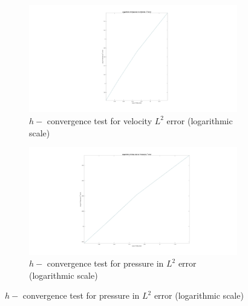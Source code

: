 \documentclass[a4paper]{book}
\begin{document}
\begin{figure}
\begin{subfigure}{\textwidth}	
  \includegraphics[width=\linewidth]{l2_velocity_log_stokes.jpg}
  \caption{$h-$ convergence test for velocity $L^2$ error (logarithmic scale)}
  \label{fig:vel_stoke_conv_log}
\end{subfigure}
\begin{subfigure}{\textwidth}	
  \includegraphics[width=\linewidth]{l2_pressure_log_stokes.jpg}
  \caption{$h-$ convergence test for pressure in $L^2$ error (logarithmic scale)}
  \label{fig:pre_stoke_conv_log}
\end{subfigure}
\label{fig:l2_stokes}
\end{figure}
\end{document}
